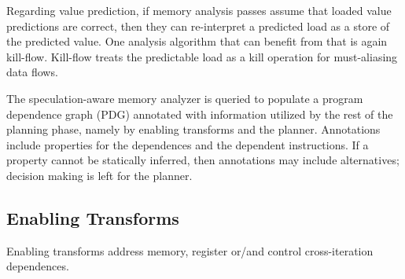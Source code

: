 
Regarding value prediction, if memory analysis passes assume that
loaded value predictions are correct, then they can re-interpret a
predicted load as a store of the predicted value. One analysis
algorithm that can benefit from that is again kill-flow. Kill-flow
treats the predictable load as a kill operation for must-aliasing data
flows.


The speculation-aware memory analyzer is queried to populate a program
dependence graph (PDG) annotated with information utilized by the rest
of the planning phase, namely by enabling transforms and the
planner. Annotations include properties for the dependences and the
dependent instructions.
If a property cannot be statically inferred, then annotations may
include alternatives; decision making is left for the planner.


\subsection{Enabling Transforms}
\label{enablers}

Enabling transforms address memory, register or/and control
cross-iteration dependences.

